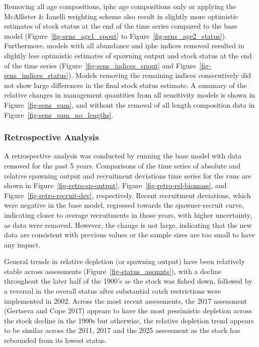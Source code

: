 \documentclass[
]{scrartcl}
\begin{document}
Removing all age compositions, \gls{iphc} age compositions only or
applying the McAllister \& Ianelli weighting scheme also result in
slightly more optimistic estimates of stock status at the end of the
time series compared to the base model (Figure~\ref{fig-sens_age1_spout}
to Figure~\ref{fig-sens_age2_status}). Furthermore, models with all
abundance and \gls{iphc} indices removed resulted in slightly less
optimistic estimates of spawning output and stock status at the end of
the time series (Figure~\ref{fig-sens_indices_spout} and
Figure~\ref{fig-sens_indices_status}). Models removing the remaining
indices consecutively did not show large differences in the final stock
status estimate. A summary of the relative changes in management
quantities from all sensitivity models is shown in
Figure~\ref{fig-sens_sum}, and without the removal of all length
composition data in Figure~\ref{fig-sens_sum_no_lengths}.

\subsubsection{Retrospective Analysis}\label{retrospective-analysis}

A retrospective analysis was conducted by running the base model with
data removed for the past 5 years. Comparisons of the time series of
absolute and relative spawning output and recruitment deviations time
series for the runs are shown in Figure~\ref{fig-retro-sp-output},
Figure~\ref{fig-retro-rel-biomass}, and
Figure~\ref{fig-retro-recruit-dev}, respectively. Recent recruitment
deviations, which were negative in the base model, regressed towards the
spawner-recruit curve, indicating closer to average recruitments in
those years, with higher uncertainty, as data were removed. However, the
change is not large, indicating that the new data are consistent with
previous values or the sample sizes are too small to have any impact.

General trends in relative depletion (or spawning output) have been
relatively stable across assessments (Figure~\ref{fig-status_assmnts}),
with a decline throughout the later half of the 1900's as the stock was
fished down, followed by a reversal in the overall status after
substantial catch restrictions were implemented in 2002. Across the most
recent assessments, the 2017 assessment (Gertseva and Cope 2017) appears
to have the most pessimistic depletion across the stock decline in the
1900s but otherwise, the relative depletion trend appears to be similar
across the 2011, 2017 and the 2025 assessment as the stock has rebounded
from its lowest status.
\end{document}
